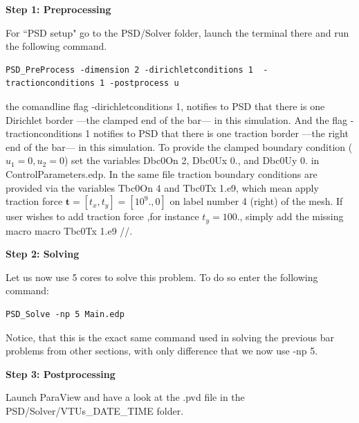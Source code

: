 \documentclass{report}
\begin{document}
\textbf{Step 1: Preprocessing}

For ``PSD setup" go to the {\ttfamily PSD/Solver} folder, launch the terminal there and run the following command.
\begin{lstlisting}[style=Linux]
PSD_PreProcess -dimension 2 -dirichletconditions 1  -tractionconditions 1 -postprocess u
\end{lstlisting}
%
the comandline flag {\ttfamily -dirichletconditions 1}, notifies to PSD that there is one Dirichlet border ---the clamped end of the bar--- in this simulation. And the flag {\ttfamily -tractionconditions 1} notifies to PSD that there is one traction border ---the right end of the bar--- in this simulation. 
To provide the clamped boundary condition ($u_1=0,u_2=0$) set the variables  {\ttfamily Dbc0On 2}, {\ttfamily Dbc0Ux 0.}, and {\ttfamily Dbc0Uy 0.} in {\ttfamily ControlParameters.edp}. In the same file traction boundary conditions are provided via the variables {\ttfamily Tbc0On 4} and {\ttfamily Tbc0Tx 1.e9}, which mean apply traction force $\mathbf t=[t_x,t_y]=[10^9.,0]$ on label number 4 (right) of the mesh. If user wishes to add traction force ,for instance $t_y=100.$, simply add the missing macro {\ttfamily macro Tbc0Tx 1.e9 //}.


\textbf{Step 2: Solving}

Let us now use 5 cores to solve this problem. To do so enter the following command:

\begin{lstlisting}[style=Linux]
PSD_Solve -np 5 Main.edp
\end{lstlisting}
%
Notice, that this is the exact same command used in solving the previous bar problems from other sections, with only difference that we now use {\ttfamily -np 5}.


\textbf{Step 3: Postprocessing}

Launch ParaView and have a look at the  {\ttfamily .pvd} file in the  {\ttfamily PSD/Solver/VTUs\_DATE\_TIME} folder. 
\end{document}
